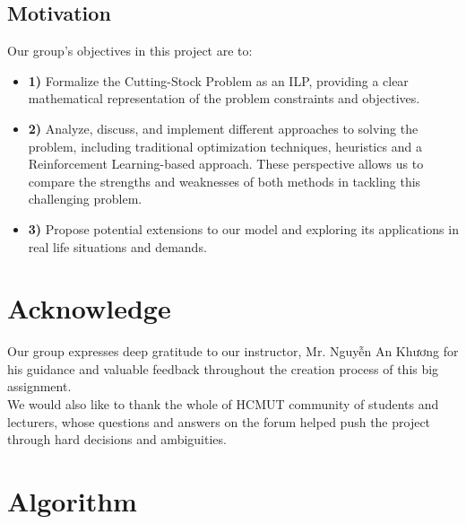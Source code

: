 \documentclass[a4paper]{article}
\begin{document}
    \subsection{Motivation}
    Our group’s objectives in this project are to:

    \begin{itemize}
        \item \textbf{1)} Formalize the Cutting-Stock Problem as an ILP, providing a clear mathematical representation of the problem constraints and objectives.
        \item \textbf{2)} Analyze, discuss, and implement different approaches to solving the problem, including traditional optimization techniques, heuristics and a Reinforcement Learning-based approach. 
        These perspective allows us to compare the strengths and weaknesses of both methods in tackling this challenging problem.
        \item \textbf{3)} Propose potential extensions to our model and exploring its applications in real life situations and demands.
    \end{itemize}


    \pagebreak
    \section{Acknowledge}

    Our group expresses deep gratitude to our instructor, Mr. Nguyễn An Khương for his guidance and valuable feedback throughout the creation process of this big assignment. 
    \vspace{0.2cm}\\
    We would also like to thank the whole of HCMUT community of students and lecturers, whose questions and answers on the forum helped push the project through hard decisions and ambiguities.

    \pagebreak
    \section{Algorithm}
\end{document}
